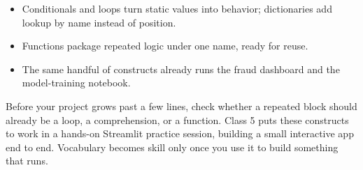 \classclosingframe
{\begin{itemize}
\item Conditionals and loops turn static values into behavior; dictionaries add lookup by name instead of position.
\item Functions package repeated logic under one name, ready for reuse.
\item The same handful of constructs already runs the fraud dashboard and the model-training notebook.
\end{itemize}}
{Before your project grows past a few lines, check whether a repeated block should already be a loop, a comprehension, or a function.}
{Class 5 puts these constructs to work in a hands-on Streamlit practice session, building a small interactive app end to end.}
{Vocabulary becomes skill only once you use it to build something that runs.}


